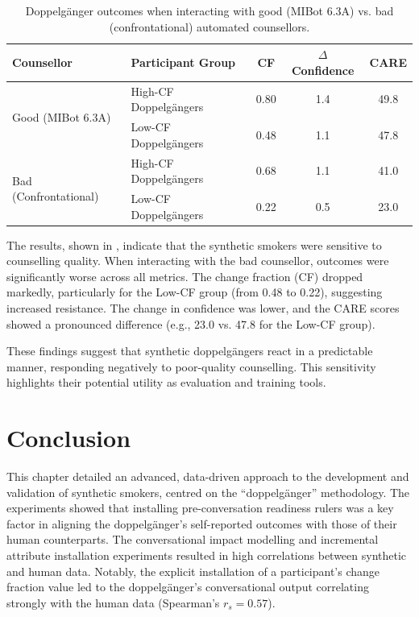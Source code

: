 \begin{table}[ht!]
	\centering
	\begin{tabular}{@{}llccc@{}}
		\toprule
		\textbf{Counsellor}                    & \textbf{Participant Group} & \textbf{CF} & \textbf{$\Delta$Confidence} & \textbf{CARE} \\ \midrule
		\multirow{2}{*}{Good (MIBot 6.3A)}     & High-CF Doppelgängers      & 0.80        & 1.4                         & 49.8          \\
		                                       & Low-CF Doppelgängers       & 0.48        & 1.1                         & 47.8          \\ \midrule
		\multirow{2}{*}{Bad (Confrontational)} & High-CF Doppelgängers      & 0.68        & 1.1                         & 41.0          \\
		                                       & Low-CF Doppelgängers       & 0.22        & 0.5                         & 23.0          \\ \bottomrule
	\end{tabular}
	\caption[Effect of counselling quality on doppelgängers' motivational language.]{Doppelgänger outcomes when interacting with good (MIBot 6.3A) vs. bad (confrontational) automated counsellors.}
	\label{tab:good-vs-bad-counselling}
\end{table}

The results, shown in , indicate that the synthetic
smokers were sensitive to counselling quality. When interacting with the bad
counsellor, outcomes were significantly worse across all metrics. The change fraction
(CF) dropped markedly, particularly for the Low-CF group (from 0.48 to 0.22),
suggesting increased resistance. The change in confidence was lower, and the CARE
scores showed a pronounced difference (e.g., 23.0 vs. 47.8 for the Low-CF group).

These findings suggest that synthetic doppelgängers react in a predictable manner,
responding negatively to poor-quality counselling. This sensitivity highlights their
potential utility as evaluation and training tools.

\section{Conclusion}

This chapter detailed an advanced, data-driven approach to the development and
validation of synthetic smokers, centred on the ``doppelgänger'' methodology. The
experiments showed that installing pre-conversation readiness rulers was a key factor
in aligning the doppelgänger's self-reported outcomes with those of their human
counterparts. The conversational impact modelling and incremental attribute
installation experiments resulted in high correlations between synthetic and human
data. Notably, the explicit installation of a participant's change fraction value led
to the doppelgänger's conversational output correlating strongly with the human data
(Spearman's $r_s = 0.57$).

